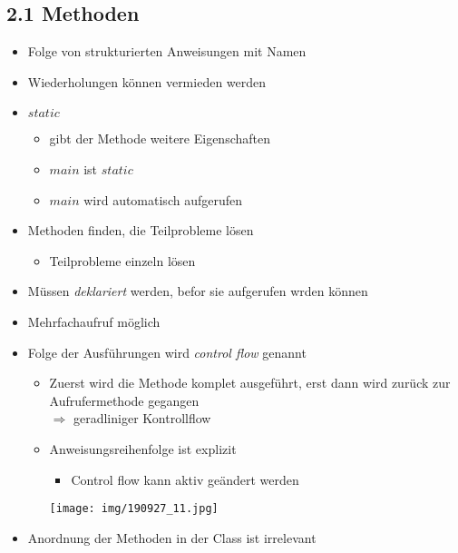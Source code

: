 \documentclass[11pt]{article}
\begin{document}
\subsection{2.1 Methoden}
\label{sec:orgb24fbaa}
\begin{itemize}
\item Folge von strukturierten Anweisungen mit Namen\\
\item Wiederholungen können vermieden werden\\
\item \(static\)\\
\begin{itemize}
\item gibt der Methode weitere Eigenschaften\\
\item \(main\) ist \(static\)\\
\item \(main\) wird automatisch aufgerufen\\
\end{itemize}
\item Methoden finden, die Teilprobleme lösen\\
\begin{itemize}
\item Teilprobleme einzeln lösen\\
\end{itemize}
\item Müssen \emph{deklariert} werden, befor sie aufgerufen wrden können\\
\item Mehrfachaufruf möglich\\
\item Folge der Ausführungen wird \emph{control flow} genannt\\
\begin{itemize}
\item Zuerst wird die Methode komplet ausgeführt, erst dann wird zurück zur Aufrufermethode gegangen\\
\(\Rightarrow\) geradliniger Kontrollflow\\
\item Anweisungsreihenfolge ist explizit\\
\begin{itemize}
\item Control flow kann aktiv geändert werden\\
\end{itemize}
\begin{center}
\texttt{[image: img/190927\_11.jpg]}
\end{center}
\end{itemize}
\item Anordnung der Methoden in der Class ist irrelevant\\
\end{itemize}
\end{document}
